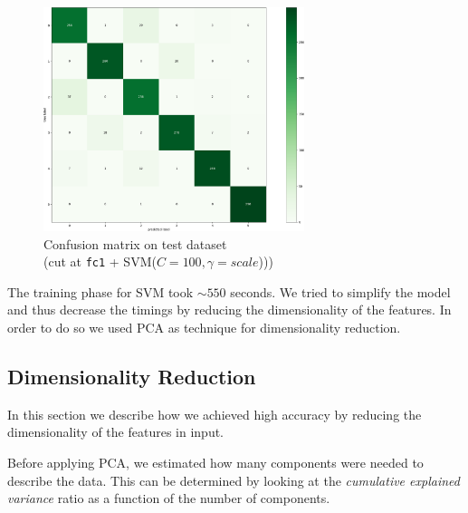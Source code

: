 \documentclass[compsoc]{IEEEtran}
\begin{document}
\begin{figure}[ht!]
\centering                                                                        
\includegraphics[width=3in]{../images/cm1-test.png}
\captionsetup{justification=centering}                                                                                         
\caption{Confusion matrix on test dataset \\ (cut at \texttt{fc1} + SVM($C=100, \gamma=scale$)))}
\label{fig:cm1-test}                                                                                                                               
\end{figure}

The training phase for SVM took ${\sim550}$ seconds. We tried to simplify the model and thus decrease the timings by reducing the dimensionality of the features. In order to do so we used PCA as technique for dimensionality reduction.


\subsection{Dimensionality Reduction}
In this section we describe how we achieved high accuracy by reducing the dimensionality of the features in input.\par
Before applying PCA, we estimated how many components were needed to describe the data. This can be determined by looking at the \emph{cumulative explained variance} ratio as a function of the number of components.
\end{document}
